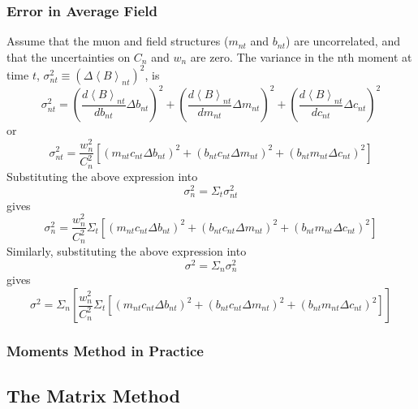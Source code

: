 \documentclass[twoside]{article}
\begin{document}
\subsubsection{Error in Average Field}
Assume that the muon and field structures ($m_{nt}$ and $b_{nt}$) are uncorrelated, and that the uncertainties on $C_n$ and $w_n$ are zero. The variance in the nth moment at time $t$, $\sigma^2_{nt} \equiv (\Delta \left\langle B \right\rangle_{nt})^2$, is 
\begin{equation}
\sigma^2_{nt} =
(\frac{d \left\langle B \right\rangle_{nt}}{db_{nt}}\Delta b_{nt})^2 +
(\frac{d \left\langle B \right\rangle_{nt}}{dm_{nt}}\Delta m_{nt})^2 + 
(\frac{d \left\langle B \right\rangle_{nt}}{dc_{nt}}\Delta c_{nt})^2 
\end{equation}
or 
\begin{equation}
\boxed{
\sigma^2_{nt} =
\frac{w^2_n}{C^2_n}[(m_{nt} c_{nt} \Delta b_{nt})^2 + (b_{nt} c_{nt} \Delta m_{nt})^2  + (b_{nt} m_{nt} \Delta c_{nt})^2 ]
}
\end{equation}
Substituting the above expression into
\begin{equation}
\sigma^2_{n} = \Sigma_t  \sigma^2_{nt} 
\end{equation}
gives 
\begin{equation}
\boxed{
\sigma^2_{n} = \frac{w^2_n}{C^2_n} \Sigma_t  [(m_{nt} c_{nt} \Delta b_{nt})^2 + (b_{nt} c_{nt} \Delta m_{nt})^2  + (b_{nt} m_{nt} \Delta c_{nt})^2 ]
}
\end{equation}
Similarly, substituting the above expression into
\begin{equation}
\sigma^2 = \Sigma_n  \sigma^2_{n} 
\end{equation}
gives
\begin{equation}
\boxed{
	\sigma^2 = \Sigma_n [\frac{w^2_n}{C^2_n} \Sigma_t  [(m_{nt} c_{nt} \Delta b_{nt})^2 + (b_{nt} c_{nt} \Delta m_{nt})^2  + (b_{nt} m_{nt} \Delta c_{nt})^2 ]]
}
\end{equation}


\subsubsection{Moments Method in Practice}




\subsection{The Matrix Method}
\end{document}
